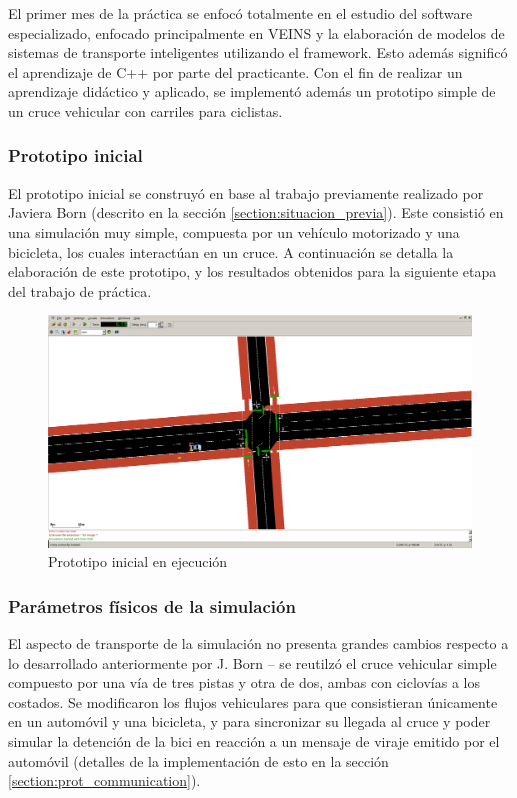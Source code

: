 \documentclass[11pt,letterpaper]{article}
\begin{document}
El primer mes de la práctica se enfocó totalmente en el estudio del software especializado, enfocado principalmente en VEINS y la elaboración de modelos de sistemas de transporte inteligentes utilizando el framework. Esto además significó el aprendizaje de C++ por parte del practicante. Con el fin de realizar un aprendizaje didáctico y aplicado, se implementó además un prototipo simple de un cruce vehicular con carriles para ciclistas.

\subsubsection{Prototipo inicial}

El prototipo inicial se construyó en base al trabajo previamente realizado por Javiera Born (descrito en la sección \ref{section:situacion_previa}). Este consistió en una simulación muy simple, compuesta por un vehículo motorizado y una bicicleta, los cuales interactúan en un cruce. A continuación se detalla la elaboración de este prototipo, y los resultados obtenidos para la siguiente etapa del trabajo de práctica.

\begin{figure}[ht]
  \centering
  \includegraphics[width=\linewidth]{prototipo_inicial.png}
  \caption{Prototipo inicial en ejecución}
  \label{fig:sumo_prototype}
\end{figure}

\subsubsection{Parámetros físicos de la simulación}

El aspecto de transporte de la simulación no presenta grandes cambios respecto a lo desarrollado anteriormente por J. Born -- se reutilzó el cruce vehicular simple compuesto por una vía de tres pistas y otra de dos, ambas con ciclovías a los costados. Se modificaron los flujos vehiculares para que consistieran únicamente en un automóvil y una bicicleta, y para sincronizar su llegada al cruce y poder simular la detención de la bici en reacción a un mensaje de viraje emitido por el automóvil (detalles de la implementación de esto en la sección \ref{section:prot_communication}).
\end{document}
